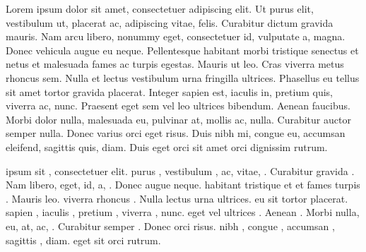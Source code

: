 \documentclass{article}
\begin{document}
\begin{minipage}[t]{.5\textwidth}
Lorem ipsum dolor sit amet, consectetuer adipiscing elit. Ut purus elit, vestibulum ut, placerat ac,
adipiscing vitae, felis. Curabitur dictum gravida mauris. Nam arcu libero, nonummy eget, consectetuer
id, vulputate a, magna. Donec vehicula augue eu neque. Pellentesque habitant morbi tristique senectus
et netus et malesuada fames ac turpis egestas. Mauris ut leo. Cras viverra metus rhoncus sem. Nulla
et lectus vestibulum urna fringilla ultrices. Phasellus eu tellus sit amet tortor gravida placerat. Integer
sapien est, iaculis in, pretium quis, viverra ac, nunc. Praesent eget sem vel leo ultrices bibendum. Aenean
faucibus. Morbi dolor nulla, malesuada eu, pulvinar at, mollis ac, nulla. Curabitur auctor semper nulla.
Donec varius orci eget risus. Duis nibh mi, congue eu, accumsan eleifend, sagittis quis, diam. Duis eget
orci sit amet orci dignissim rutrum.
\end{minipage}
%
\begin{minipage}[t]{.5\textwidth}
 ipsum  sit , consectetuer  elit.  purus , vestibulum ,  ac,
 vitae, . Curabitur  gravida . Nam  libero,  eget,  id,  a, . Donec  augue  neque.  habitant  tristique 
et  et  fames  turpis . Mauris  leo.  viverra  rhoncus . Nulla
 lectus  urna  ultrices.  eu  sit  tortor  placerat.  sapien , iaculis , pretium , viverra , nunc.  eget  vel  ultrices . Aenean
. Morbi  nulla,  eu,  at,  ac, . Curabitur  semper .
Donec  orci  risus.  nibh , congue , accumsan , sagittis , diam.  eget
 sit  orci  rutrum.
\end{minipage}
\end{document}
